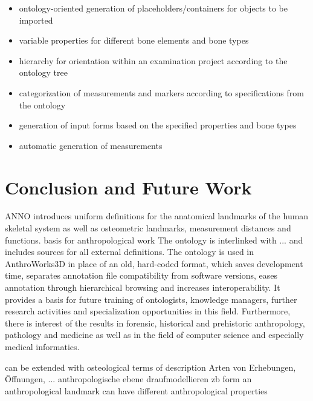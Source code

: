 \documentclass[sw]{iosart2x}
\newcommand{\aw}{AnthroWorks3D}
\begin{document}
\begin{itemize}
\item ontology-oriented generation of placeholders/containers for objects to be imported
\item variable properties for different bone elements and bone types 
\item hierarchy for orientation within an examination project according to the ontology tree
\item categorization of measurements and markers according to specifications from the ontology
\item generation of input forms based on the specified properties and bone types
\item automatic generation of measurements
\end{itemize}


\section{Conclusion and Future Work}
ANNO introduces uniform definitions for the anatomical landmarks of the human skeletal system as well as osteometric landmarks, measurement distances and functions.
basis for anthropological work
The ontology is interlinked with ... and includes sources for all external definitions.
The ontology is used in \aw{} in place of an old, hard-coded format, which saves development time, separates annotation file compatibility from software versions, eases annotation through hierarchical browsing and increases interoperability.
It provides a basis for future training of ontologists, knowledge managers, further research activities and specialization opportunities in this field.
Furthermore, there is interest of the results in forensic, historical and prehistoric anthropology, pathology and medicine as well as in the field of computer science and especially medical informatics.

can be extended with osteological terms of description
Arten von Erhebungen, Öffnungen, ...
anthropologische ebene draufmodellieren zb form
an anthropological landmark can have different anthropological properties
\end{document}
